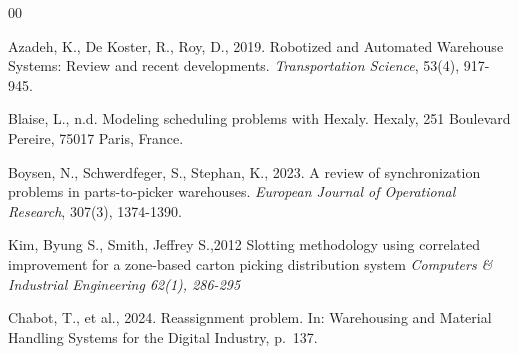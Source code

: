 \documentclass[preprint,review,11pt,authoryear]{elsarticle}
\begin{document}



\begin{thebibliography}{00}


Azadeh, K., De Koster, R., Roy, D., 2019. Robotized and Automated Warehouse Systems: Review and recent developments. \textit{Transportation Science}, 53(4), 917-945.


Blaise, L., n.d. Modeling scheduling problems with Hexaly. Hexaly, 251 Boulevard Pereire, 75017 Paris, France.

Boysen, N., Schwerdfeger, S., Stephan, K., 2023. A review of synchronization problems in parts-to-picker warehouses. \textit{European Journal of Operational Research}, 307(3), 1374-1390.

Kim, Byung S., Smith, Jeffrey S.,2012
Slotting methodology using correlated improvement for a zone-based carton picking distribution system
\textit{Computers \& Industrial Engineering 62(1), 286-295}


Chabot, T., et al., 2024. Reassignment problem. In: Warehousing and Material Handling Systems for the Digital Industry, p.~137.


\end{thebibliography}
\end{document}
